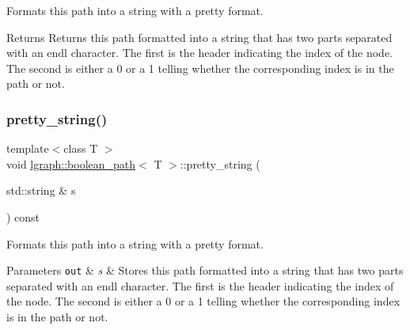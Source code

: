 Formats this path into a string with a \textquotesingle{}pretty\textquotesingle{} format. 

\begin{DoxyReturn}{Returns}
Returns this path formatted into a string that has two parts separated with an \textquotesingle{}endl\textquotesingle{} character. The first is the header indicating the index of the node. The second is either a 0 or a 1 telling whether the corresponding index is in the path or not. 
\end{DoxyReturn}
\mbox{\label{classlgraph_1_1boolean__path_afc470414b972269818fa55ff4bad12ee}} 
\subsubsection{\texorpdfstring{pretty\+\_\+string()}{pretty\_string()}\hspace{0.1cm}{\footnotesize\ttfamily [2/2]}}
{\footnotesize\ttfamily template$<$class T $>$ \\
void \hyperlink{classlgraph_1_1boolean__path}{lgraph\+::boolean\+\_\+path}$<$ T $>$\+::pretty\+\_\+string (\begin{DoxyParamCaption}\item[{std\+::string \&}]{s }\end{DoxyParamCaption}) const}



Formats this path into a string with a \textquotesingle{}pretty\textquotesingle{} format. 


\begin{DoxyParams}[1]{Parameters}
\mbox{\tt out}  & {\em s} & Stores this path formatted into a string that has two parts separated with an \textquotesingle{}endl\textquotesingle{} character. The first is the header indicating the index of the node. The second is either a 0 or a 1 telling whether the corresponding index is in the path or not. \\
\hline
\end{DoxyParams}
\mbox{\label{classlgraph_1_1boolean__path_a322855eaf5660b2f478c95e2ca26e119}} 

